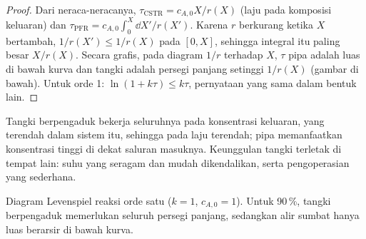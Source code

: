 \begin{proof}
Dari neraca-neracanya, $\tau_{\text{CSTR}} = c_{A,0}X/r(X)$ (laju pada
komposisi keluaran) dan $\tau_{\text{PFR}} = c_{A,0}\int_0^X\dd X'/r(X')$.
Karena $r$ berkurang ketika $X$ bertambah, $1/r(X') \leq 1/r(X)$ pada
$[0, X]$, sehingga integral itu paling besar $X/r(X)$. Secara grafis, pada
diagram $1/r$ terhadap $X$, $\tau$ pipa adalah luas di bawah kurva dan
 tangki adalah persegi panjang setinggi $1/r(X)$ (gambar di
bawah).
Untuk orde 1: $\ln(1 + k\tau) \leq k\tau$, pernyataan yang sama dalam
bentuk lain.
\end{proof}

Tangki berpengaduk bekerja seluruhnya pada konsentrasi keluaran, yang
terendah dalam sistem itu, sehingga pada laju terendah; pipa memanfaatkan
konsentrasi tinggi di dekat saluran masuknya. Keunggulan tangki terletak
di tempat lain: suhu yang seragam dan mudah dikendalikan, serta
pengoperasian yang sederhana.

\begin{omfigure}

{\small Diagram Levenspiel reaksi orde satu ($k = 1$, $c_{A,0} = 1$). Untuk
 90\,\%, tangki berpengaduk memerlukan seluruh persegi panjang,
sedangkan alir sumbat hanya luas berarsir di bawah kurva.}
\end{omfigure}

